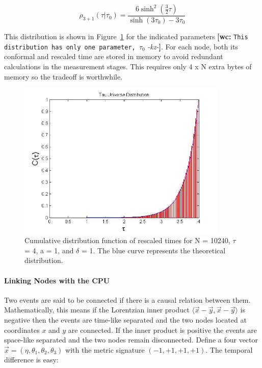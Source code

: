 \documentclass[preprint,notitlepage,amsmath,amssymb,floatfix]{revtex4-1}
\newcommand{\XXX}[3]{{\bf [#1: } {\tt #3} {\it -#2-}{\bf ]}}
\begin{document}
\begin{equation}
\label{eq:rhotau3}
\rho_{3+1}\left(\tau|\tau_0\right) = \frac{6\sinh^2\left(\frac{3}{2}\tau\right)}{\sinh\left(3\tau_0\right) - 3\tau_0}
\end{equation}

\noindent This distribution is shown in Figure~\ref{fig:tau_cdf} for the indicated parameters \XXX{wc}{kz}{This distribution has only one parameter, $\tau_0$}.
For each node, both its conformal and rescaled time are stored in memory to avoid redundant calculations in the measurement stages.
This requires only 4 x N extra bytes of memory so the tradeoff is worthwhile.

\begin{figure}
\includegraphics[width=10cm]{figures/tau_dist.jpg}
\caption{Cumulative distribution function of rescaled times for N = 10240, $\tau$ = 4, a = 1, and $\delta$ = 1.  The blue curve represents the theoretical distribution.}
\label{fig:tau_cdf}
\centering
\end{figure}

\paragraph{Linking Nodes with the CPU}
Two events are said to be connected if there is a causal relation between them.  
Mathematically, this means if the Lorentzian inner product $\langle \vec x - \vec y, \vec x - \vec y\rangle$ is negative then the events are time-like separated and the two nodes located at coordinates $x$ and $y$ are connected.  
If the inner product is positive the events are space-like separated and the two nodes remain disconnected.
Define a four vector $\vec x = \left(\eta, \theta_1, \theta_2, \theta_3\right)$ with the metric signature $\left(-1,+1,+1,+1\right)$.
The temporal difference is easy:
\end{document}
